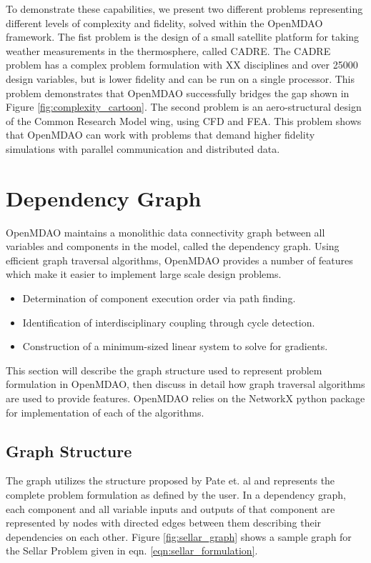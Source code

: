 \documentclass[]{aiaa-tc} %
\begin{document}
    To demonstrate these capabilities, we present two different problems representing different levels of
    complexity and fidelity, solved within the OpenMDAO framework. The fist problem is the design of a small
    satellite platform for taking weather measurements in the thermosphere, called CADRE. The CADRE problem has a
    complex problem formulation with XX disciplines and over 25000 design variables, but is lower fidelity and can
    be run on a single processor. This problem demonstrates that OpenMDAO successfully bridges the gap shown
    in Figure \ref{fig:complexity_cartoon}. The second problem is an aero-structural design of the Common Research
    Model wing, using CFD and FEA. This problem shows that OpenMDAO can work with problems that demand higher fidelity
    simulations with parallel communication and distributed data.

  \section{Dependency Graph}

    OpenMDAO maintains a monolithic data connectivity graph between all
    variables and components in the model, called the dependency graph.
    Using efficient graph traversal algorithms, OpenMDAO provides a number of
    features which make it easier to implement large scale design problems.

    \begin{itemize}
      \item Determination of component execution order via path finding.
      \item Identification of interdisciplinary coupling through cycle detection.
      \item Construction of a minimum-sized linear system to solve for gradients.
    \end{itemize}

    This section will describe the graph structure used to represent problem formulation in OpenMDAO,
    then discuss in detail how graph traversal algorithms are used to provide features. OpenMDAO relies
    on the NetworkX \cite{hagberg-2008-exploring} python package for implementation of each of
    the algorithms.


    \subsection{Graph Structure}
    The graph utilizes the structure proposed by
    Pate et. al \cite{graph_problem2013} and represents the complete problem formulation as
    defined by the user. In a dependency graph, each component and all variable inputs and outputs of that component are
    represented by nodes with directed edges between them describing their dependencies on each other.
    Figure \ref{fig:sellar_graph} shows a sample graph for the Sellar Problem \cite{AIAA:sellar}
    given in eqn. \ref{eqn:sellar_formulation}.
\end{document}
